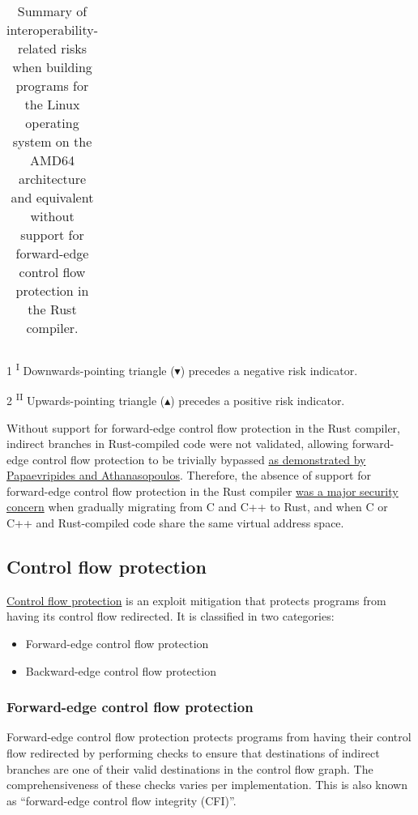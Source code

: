 \documentclass{article}
\begin{document}
\begin{table}[H]
\begin{tabular}{p{0.3\linewidth} | p{0.3\linewidth} | p{0.3\linewidth}}
\end{tabular}
\begin{tablenotes}
\item[1] \textsuperscript{I} Downwards-pointing triangle ($\blacktriangledown$) precedes a negative risk indicator.
\item[2] \textsuperscript{II} Upwards-pointing triangle ($\blacktriangleup$) precedes a positive risk indicator.
\end{tablenotes}
\caption{\label{table1}Summary of interoperability-related risks when building programs for the Linux operating system on the AMD64 architecture and equivalent without support for forward-edge control flow protection in the Rust compiler.}
\end{table}

Without support for forward-edge control flow protection in the Rust compiler, indirect branches in Rust-compiled code were not validated, allowing forward-edge control flow protection to be trivially bypassed \href{https://dl.acm.org/doi/pdf/10.1145/3418898}{as demonstrated by Papaevripides and Athanasopoulos}. Therefore, the absence of support for forward-edge control flow protection in the Rust compiler \href{https://opensrcsec.com/open_source_security_announces_rust_gcc_funding}{was a major security concern} when gradually migrating from C and C++ to Rust, and when C or C++ and Rust-compiled code share the same virtual address space.


\subsection{Control flow protection}
\label{control-flow-protection}

\href{https://en.wikipedia.org/wiki/Control-flow_integrity}{Control flow protection} is an exploit mitigation that protects programs from having its control flow redirected. It is classified in two categories:

\begin{itemize}
\item Forward-edge control flow protection
\item Backward-edge control flow protection
\end{itemize}


\subsubsection{Forward-edge control flow protection}

Forward-edge control flow protection protects programs from having their control flow redirected by performing checks to ensure that destinations of indirect branches are one of their valid destinations in the control flow graph. The comprehensiveness of these checks varies per implementation. This is also known as “forward-edge control flow integrity (CFI)”.
\end{document}
